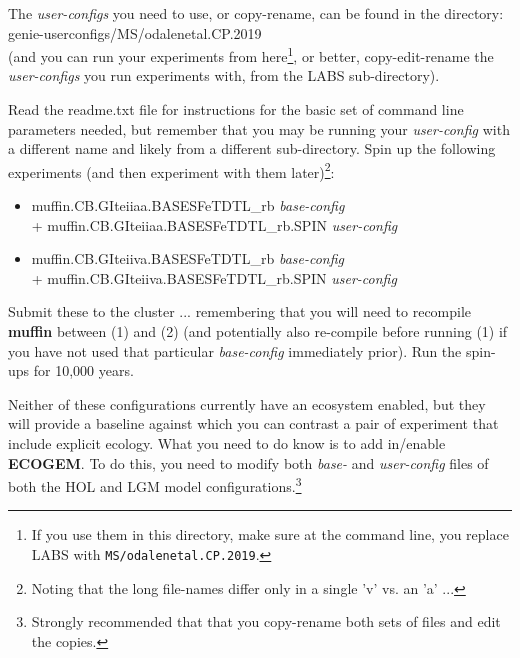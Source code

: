 \documentclass[11pt,fleqn]{book} %
\begin{document}
\vspace{1mm}

The \textit{user-configs} you need to use, or copy-rename, can be found in the directory:
\vspace{1mm}
\\\textsf{\footnotesize genie-userconfigs/MS/odalenetal.CP.2019}
\vspace{1mm}
\\\noindent(and you can run your experiments from here\footnote{If you use them in this directory, make sure at the command line, you replace LABS with \texttt{MS/odalenetal.CP.2019}.}, or better, copy-edit-rename the \textit{user-configs} you run experiments with, from the \textsf{\footnotesize LABS} sub-directory).

Read the \textsf{\footnotesize readme.txt} file for instructions for the basic set of command line parameters needed, but remember that you may be running your \textit{user-config} with a different name and likely from a different sub-directory.
Spin up the following experiments  (and then experiment with them later)\footnote{Noting that the long file-names differ only in a single '\textsf{v}' vs. an '\textsf{a}' ...}:

\vspace{1mm}
\begin{itemize}[noitemsep]
\item[(1)] \textsf{\footnotesize muffin.CB.GIteiiaa.BASESFeTDTL\_rb } \textit{base-config} \\+ \textsf{\footnotesize muffin.CB.GIteiiaa.BASESFeTDTL\_rb.SPIN } \textit{user-config}
\item[(2)] \textsf{\footnotesize muffin.CB.GIteiiva.BASESFeTDTL\_rb } \textit{base-config} \\+ \textsf{\footnotesize muffin.CB.GIteiiva.BASESFeTDTL\_rb.SPIN } \textit{user-config}
\end{itemize}
\vspace{1mm}

\noindent Submit these to the cluster ...  remembering that you will need to recompile \textbf{muffin} between (1) and (2) (and potentially also re-compile before running (1) if you have not  used that particular \textit{base-config} immediately prior). Run the spin-ups for 10,000 years.

Neither of these configurations currently have an ecosystem enabled, but they will provide a baseline against which you can  contrast a pair of experiment that include explicit ecology. What you need to do know is to add in/enable \textbf{ECOGEM}. To do this, you need to modify both \textit{base-} and \textit{user-config} files of both the HOL and LGM model configurations.\footnote{Strongly recommended that that you copy-rename both sets of files and edit the copies.}
\end{document}
